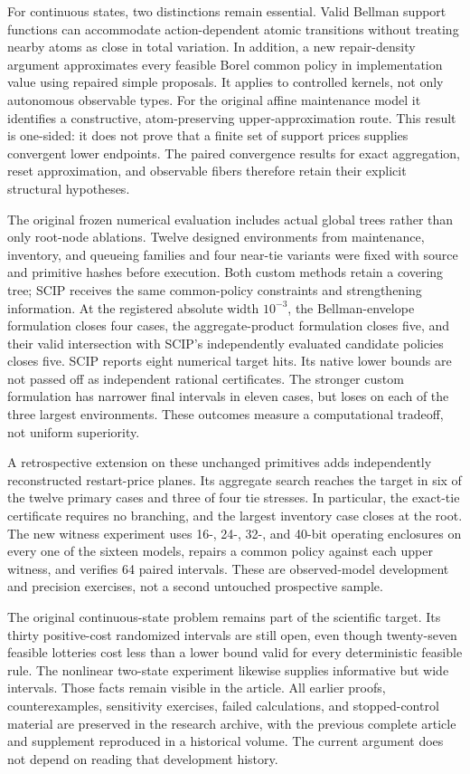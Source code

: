 For continuous states, two distinctions remain essential. Valid Bellman support functions can accommodate action-dependent atomic transitions without treating nearby atoms as close in total variation. In addition, a new repair-density argument approximates every feasible Borel common policy in implementation value using repaired simple proposals. It applies to controlled kernels, not only autonomous observable types. For the original affine maintenance model it identifies a constructive, atom-preserving upper-approximation route. This result is one-sided: it does not prove that a finite set of support prices supplies convergent lower endpoints. The paired convergence results for exact aggregation, reset approximation, and observable fibers therefore retain their explicit structural hypotheses.

The original frozen numerical evaluation includes actual global trees rather than only root-node ablations. Twelve designed environments from maintenance, inventory, and queueing families and four near-tie variants were fixed with source and primitive hashes before execution. Both custom methods retain a covering tree; SCIP receives the same common-policy constraints and strengthening information. At the registered absolute width $10^{-3}$, the Bellman-envelope formulation closes four cases, the aggregate-product formulation closes five, and their valid intersection with SCIP's independently evaluated candidate policies closes five. SCIP reports eight numerical target hits. Its native lower bounds are not passed off as independent rational certificates. The stronger custom formulation has narrower final intervals in eleven cases, but loses on each of the three largest environments. These outcomes measure a computational tradeoff, not uniform superiority.

A retrospective extension on these unchanged primitives adds independently reconstructed restart-price planes. Its aggregate search reaches the target in six of the twelve primary cases and three of four tie stresses. In particular, the exact-tie certificate requires no branching, and the largest inventory case closes at the root. The new witness experiment uses 16-, 24-, 32-, and 40-bit operating enclosures on every one of the sixteen models, repairs a common policy against each upper witness, and verifies 64 paired intervals. These are observed-model development and precision exercises, not a second untouched prospective sample.

The original continuous-state problem remains part of the scientific target. Its thirty positive-cost randomized intervals are still open, even though twenty-seven feasible lotteries cost less than a lower bound valid for every deterministic feasible rule. The nonlinear two-state experiment likewise supplies informative but wide intervals. Those facts remain visible in the article. All earlier proofs, counterexamples, sensitivity exercises, failed calculations, and stopped-control material are preserved in the research archive, with the previous complete article and supplement reproduced in a historical volume. The current argument does not depend on reading that development history.

